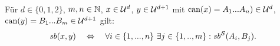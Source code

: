 \begin{dfn}[$\Gsb$]\ \\
    Für $d \in \{0,1,2\}$, $m,n \in \mathbb{N}$, $x \in \mathcal{U}^d$, $y \in \mathcal{U}^{d+1}$ mit $\text{can}(x) = A_1 ... A_n) \in \mathcal{U}^d$, $\text{can}(y) = B_1 ... B_m \in \mathcal{U}^{d+1}$ gilt:
    \begin{align*}
        \mathit{sb}(x,y) \quad \Leftrightarrow \quad \forall i \in \{1, ..., n\}\ \exists j \in \{1, .., m\}: \mathit{sb}^{\mathcal{S}}(A_i,B_j).
    \end{align*}
\end{dfn}








